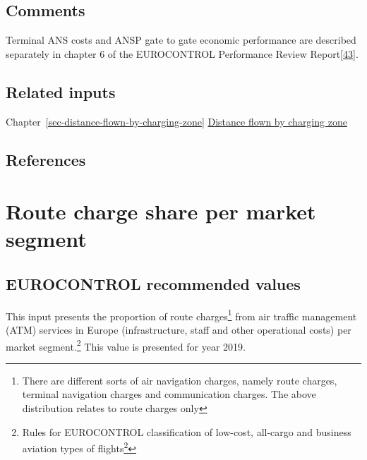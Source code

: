 \documentclass[
  11pt,
  a4paper,
]{book}
\DeclareRobustCommand{\href}[2]{#2\footnote{\url{#1}}}
\begin{document}
\hypertarget{comments-9}{%
\section{Comments}\label{comments-9}}

Terminal ANS costs and ANSP gate to gate economic performance are
described separately in chapter 6 of the EUROCONTROL Performance Review
Report\protect\hyperlink{ref-ectrlprr2022}{{[}43{]}}.

\hypertarget{related-inputs-20}{%
\section{Related inputs}\label{related-inputs-20}}

Chapter~\ref{sec-distance-flown-by-charging-zone}
\protect\hyperlink{sec-distance-flown-by-charging-zone}{Distance flown
by charging zone}

\hypertarget{references-26}{%
\section{References}\label{references-26}}

\hypertarget{sec-route-charge-share-per-market-segment}{%
\chapter{Route charge share per market
segment}\label{sec-route-charge-share-per-market-segment}}

\hypertarget{eurocontrol-recommended-values-25}{%
\section{EUROCONTROL recommended
values}\label{eurocontrol-recommended-values-25}}

This input presents the proportion of route charges\footnote{There are
  different sorts of air navigation charges, namely route charges,
  terminal navigation charges and communication charges. The above
  distribution relates to route charges only} from air traffic
management (ATM) services in Europe (infrastructure, staff and other
operational costs) per market segment.\footnote{\href{https://www.eurocontrol.int/publication/market-segment-rules}{Rules
  for EUROCONTROL classification of low-cost, all-cargo and business
  aviation types of flights}} This value is presented for year 2019.
\end{document}
